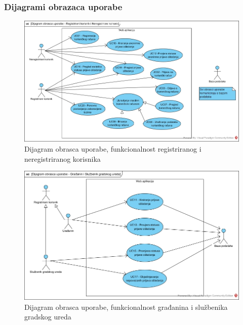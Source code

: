 \eject

\subsubsection{Dijagrami obrazaca uporabe}

\begin{figure}[H]
	\includegraphics[scale=0.5]{slike/UC-registrirani-neregistrirani} %
	\centering
	\caption{Dijagram obrasca uporabe, funkcionalnost registriranog i neregistriranog korisnika}
	\label{fig:DijagramObrascaUporabeRegistriranNeregistriranKorisnik}
\end{figure}

\begin{figure}[H]
	\includegraphics[scale=0.5]{slike/UC-gradanin-sluzbenik} %
	\centering
	\caption{Dijagram obrasca uporabe, funkcionalnost građanina i službenika gradskog ureda}
	\label{fig:DijagramObrascaUporabeGradaninSluzbenik}
\end{figure}

